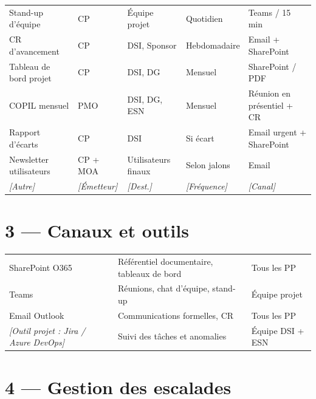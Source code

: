 \documentclass[11pt,a4paper,oneside]{report}
\begin{document}
\renewcommand{\arraystretch}{1.4}
\begin{tabularx}{\textwidth}{L{4cm} L{3cm} L{3cm} L{2.5cm} Y}
\toprule
{} &  &  &  &  \\
\midrule
Stand-up d'équipe & CP & Équipe projet & Quotidien & Teams / 15 min \\
CR d'avancement & CP & DSI, Sponsor & Hebdomadaire & Email + SharePoint \\
Tableau de bord projet & CP & DSI, DG & Mensuel & SharePoint / PDF \\
COPIL mensuel & PMO & DSI, DG, ESN & Mensuel & Réunion en présentiel + CR \\
Rapport d'écarts & CP & DSI & Si écart & Email urgent + SharePoint \\
Newsletter utilisateurs & CP + MOA & Utilisateurs finaux & Selon jalons & Email \\
\textit{[Autre]} & \textit{[Émetteur]} & \textit{[Dest.]} & \textit{[Fréquence]} & \textit{[Canal]} \\
\bottomrule
\end{tabularx}

\section*{3 — Canaux et outils}

\renewcommand{\arraystretch}{1.3}
\begin{tabularx}{\textwidth}{L{4cm} Y L{3cm}}
\toprule
{} &  &  \\
\midrule
SharePoint O365 & Référentiel documentaire, tableaux de bord & Tous les PP \\
Teams & Réunions, chat d'équipe, stand-up & Équipe projet \\
Email Outlook & Communications formelles, CR & Tous les PP \\
\textit{[Outil projet : Jira / Azure DevOps]} & Suivi des tâches et anomalies & Équipe DSI + ESN \\
\bottomrule
\end{tabularx}

\section*{4 — Gestion des escalades}
\end{document}
